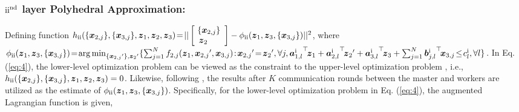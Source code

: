 \documentclass[letterpaper]{article} %
\begin{document}
\subsubsection{${\rm{\uppercase\expandafter{\romannumeral2}}}^{\rm{nd}}$ layer Polyhedral Approximation:}
Defining function $h_{{\rm{\uppercase\expandafter{\romannumeral2}}}}(\{{\boldsymbol{x}_{2,j}}\} ,\{ {\boldsymbol{x}_{3,j}}\} ,{\boldsymbol{z}_1},{\boldsymbol{z}_2},{\boldsymbol{z}_3}) \!= \!||\left[ \begin{array}{l}
\!\{{\boldsymbol{x}_{2,j}}\} \\
\boldsymbol{z}_2
\end{array} \right]  -\phi_{{\rm{\uppercase\expandafter{\romannumeral2}}}}({\boldsymbol{z}_1}, {\boldsymbol{z}_3}, \{{\boldsymbol{x}_{3,j}}\})||^2 $, where $\phi_{{\rm{\uppercase\expandafter{\romannumeral2}}}}({\boldsymbol{z}_1}, {\boldsymbol{z}_3}, \{{\boldsymbol{x}_{3,j}}\})\!=\! \mathop {\arg \min }\nolimits_{\{ {\boldsymbol{x}_{2,j}}'\} ,{\boldsymbol{z}_2}'} \{ \sum\nolimits_{j = 1}^N {{f_{2,j}}({\boldsymbol{z}_1},{\boldsymbol{x}_{2,j}}',{\boldsymbol{x}_{3,j}})}\!:\! {\boldsymbol{x}_{2,j}}' \!=\! {\boldsymbol{z}_2}', \forall j,  {\boldsymbol{a}_{1,l}^{\rm{\uppercase\expandafter{\romannumeral1}}}}^{\top}\!{\boldsymbol{z}_1} + {\boldsymbol{a}_{2,l}^{\rm{\uppercase\expandafter{\romannumeral1}}}}^{\top}\!{\boldsymbol{z}_2}' + {\boldsymbol{a}_{3,l}^{\rm{\uppercase\expandafter{\romannumeral1}}}}^{\top}\!{\boldsymbol{z}_3} + \sum\nolimits_{j = 1}^N {\boldsymbol{b}{{_{j,l}^{\rm{\uppercase\expandafter{\romannumeral1}}}}}}^{\top}\!{\boldsymbol{x}_{3,j}}  \!\le\! c_l^{\rm{\uppercase\expandafter{\romannumeral1}}},\forall l \}$.
In Eq. (\ref{eq:4}), the lower-level optimization problem can be viewed as the constraint to the upper-level optimization problem \cite{sinha2017review,gould2016differentiating}, i.e., $h_{{\rm{\uppercase\expandafter{\romannumeral2}}}}(\{{\boldsymbol{x}_{2,j}}\} ,\{ {\boldsymbol{x}_{3,j}}\} ,{\boldsymbol{z}_1},{\boldsymbol{z}_2},{\boldsymbol{z}_3}) =0$.  Likewise, following \cite{jiao2022asynchronous},  the results after $K$ communication rounds between the master and workers are utilized as the estimate of $\phi_{{\rm{\uppercase\expandafter{\romannumeral2}}}}({\boldsymbol{z}_1}, {\boldsymbol{z}_3}, \{{\boldsymbol{x}_{3,j}}\})$. Specifically, for the lower-level optimization problem in Eq. (\ref{eq:4}), the augmented Lagrangian function is given,
\end{document}
